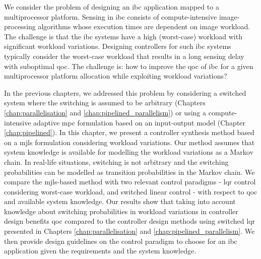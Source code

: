 
We consider the problem of designing an \gls{ibc} application mapped to a multiprocessor platform. Sensing in \gls{ibc} consists of compute-intensive image-processing algorithms whose execution times are dependent on image workload.
The challenge is that the \gls{ibc} systems have a high (worst-case) workload with significant workload variations. 
Designing controllers for such \gls{ibc} systems typically consider the worst-case workload that results in a long sensing delay with suboptimal \gls{qoc}. The challenge is: how to improve the \gls{qoc} of \gls{ibc} for a given multiprocessor platform allocation while exploiting workload variations?

In the previous chapters, we addressed this problem by considering a switched system where the switching is assumed to be arbitrary (Chapters \ref{chap:parallelisation} and \ref{chap:pipelined_parallelism}) or using a compute-intensive adaptive \gls{mpc} formulation based on an input-output model (Chapter \ref{chap:pipelined}).
In this chapter, we present a controller synthesis method based on a \gls{mjls} formulation considering workload variations.
Our method assumes that system knowledge is available for modelling the workload variations as a Markov chain.
In real-life situations, switching is not arbitrary and the switching probabilities can be modelled as transition probabilities in the Markov chain.
We compare the \gls{mjls}-based method with two relevant control paradigms - \gls{lqr} control considering worst-case workload, and switched linear control - with respect to \gls{qoc} and available system knowledge. 
Our results show that taking into account knowledge about switching probabilities in workload variations in controller design benefits \gls{qoc} compared to the controller design methods using switched \gls{lqr} presented in Chapters \ref{chap:parallelisation} and \ref{chap:pipelined_parallelism}. We then provide design guidelines on the control paradigm to choose for an \gls{ibc} application given the requirements and the system knowledge.